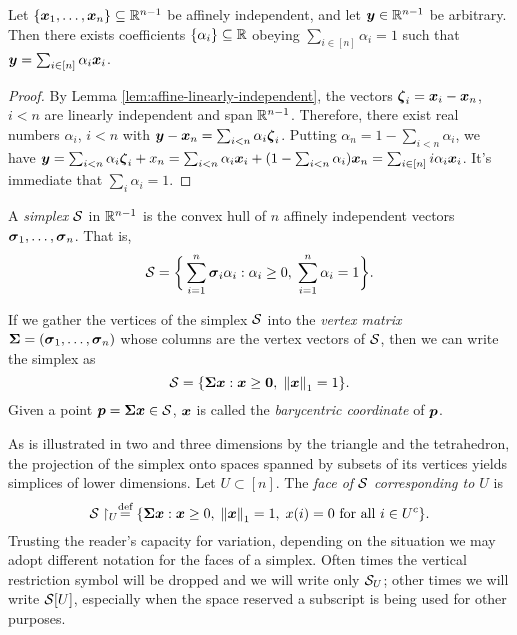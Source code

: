 \begin{lemma}
	\label{lem:barycentric_coeffs}
	Let $\{\vb*{x}_1,\dots,\vb*{x}_n\}\subseteq\mathbb{R}^{n-1}$ be affinely independent, and let  $\vb*{y}\in\mathbb{R}^{n-1}$ be arbitrary. Then there exists coefficients $\{\alpha_i\}\subseteq\mathbb{R}$ obeying $\sum_{i\in[n]}\alpha_i=1$ such that $\vb*{y}=\sum_{i\in[n]}\alpha_i\vb*{x}_i$. 
\end{lemma}
\begin{proof}
	By Lemma \ref{lem:affine-linearly-independent}, the vectors $\vb*{\zeta}_i=\vb*{x}_i-\vb*{x}_n$, $i<n$ are linearly independent and span $\mathbb{R}^{n-1}$. Therefore, there exist real numbers $\alpha_i$, $i<n$ with $\vb*{y}-\vb*{x}_n = \sum_{i<n} \alpha_i\vb*{\zeta}_i$. Putting $\alpha_n=1-\sum_{i<n}\alpha_i$, we have $\vb*{y}=\sum_{i<n}\alpha_i\vb*{\zeta}_i + x_n = \sum_{i<n} \alpha_i\vb*{x}_i + (1-\sum_{i<n}\alpha_i)\vb*{x}_n = \sum_{i\in[n]}i \alpha_i\vb*{x}_i$. It's immediate that $\sum_i\alpha_i=1$. 
\end{proof}



\begin{definition}
A \emph{simplex} $\mathcal{S}$ in $\mathbb{R}^{n-1}$ is the convex hull of $n$ affinely independent vectors $\vb*{\sigma}_1,\dots,\vb*{\sigma}_n$. That is, 
\begin{equation*}
    \mathcal{S} = \bigg\{\sum_{i=1}^n \vb*{\sigma}_i \alpha_i: \alpha_i\geq 0,\; \sum_{i=1}^n \alpha_i=1\bigg\}. 
\end{equation*}
\end{definition}

If we gather the vertices of the simplex $\mathcal{S}$ into the \emph{vertex matrix} $\boldsymbol{\Sigma}=(\vb*{\sigma}_1,\dots,\vb*{\sigma}_n)$ whose columns are the vertex vectors of $\mathcal{S}$, then we can write the simplex as 
\begin{equation*}
    \mathcal{S} = \{\boldsymbol{\Sigma} \vb*{x}:\vb*{x}\geq \vb{0}, \; \norm{\vb*{x}}_1=1\}.
\end{equation*}
Given a point $\vb*{p}=\boldsymbol{\Sigma}\vb*{x}\in\mathcal{S}$, $\vb*{x}$ is called the \emph{barycentric coordinate} of $\vb*{p}$.  

As is illustrated in two and three dimensions by the triangle and the tetrahedron, the projection of the simplex onto spaces spanned by subsets of its vertices yields simplices of lower dimensions. Let $U\subset [n]$. The \emph{face of $\mathcal{S}$ corresponding to $U$} is 
\begin{equation*}
    \mathcal{S}\restriction_U \overset{\text{def}}{=} \{\boldsymbol{\Sigma}\vb*{x}: \vb*{x}\geq 0,\;\norm{\vb*{x}}_1=1,\;x(i)=0\text{ for all }i\in U^c\}.
\end{equation*}
Trusting the reader's capacity for variation, depending on the situation we may adopt different notation for the faces of a simplex. Often times the vertical restriction symbol will be dropped and we will write only $\mathcal{S}_U$; other times we will write $\mathcal{S}[U]$, especially when the space reserved a subscript is being used for other purposes. 

